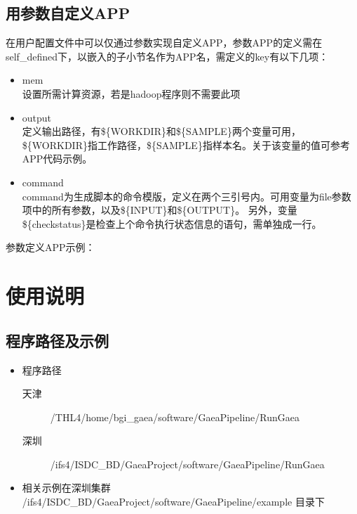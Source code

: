 \documentclass[UTF8,10pt,a4paper]{ctexart}
\begin{document}
\subsection{用参数自定义APP}
在用户配置文件中可以仅通过参数实现自定义APP，参数APP的定义需在self\_defined下，以嵌入的子小节名作为APP名，需定义的key有以下几项：
\begin{itemize}
\item mem\\
设置所需计算资源，若是hadoop程序则不需要此项
\item output\\
定义输出路径，有\$\{WORKDIR\}和\$\{SAMPLE\}两个变量可用，\$\{WORKDIR\}指工作路径，\$\{SAMPLE\}指样本名。关于该变量的值可参考APP代码示例。
\item command\\
command为生成脚本的命令模版，定义在两个三引号内。可用变量为file参数项中的所有参数，以及\$\{INPUT\}和\$\{OUTPUT\}。
另外，变量\$\{checkstatus\}是检查上个命令执行状态信息的语句，需单独成一行。
\end{itemize}


参数定义APP示例：




\section{使用说明}
%

\subsection{程序路径及示例}

\begin{itemize}
\item 程序路径
\begin{description}
\item[ 天津] /THL4/home/bgi\_gaea/software/GaeaPipeline/RunGaea
\item[ 深圳] /ifs4/ISDC\_BD/GaeaProject/software/GaeaPipeline/RunGaea
\end{description}
\item 相关示例在深圳集群 /ifs4/ISDC\_BD/GaeaProject/software/GaeaPipeline/example 目录下
\end{itemize}
\end{document}
